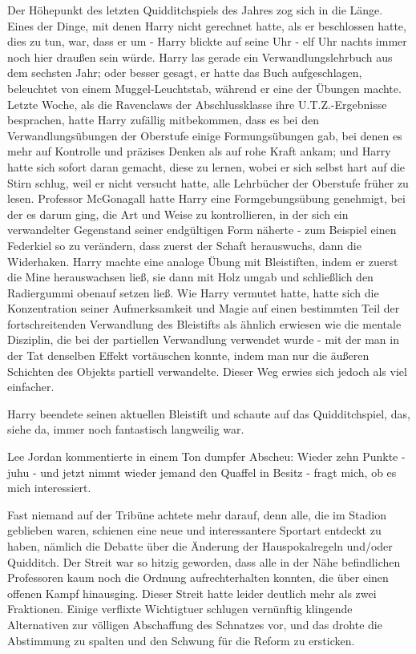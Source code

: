 Der Höhepunkt des letzten Quidditchspiels des Jahres zog sich in die Länge.
Eines der Dinge, mit denen Harry nicht gerechnet hatte, als er beschlossen
hatte, dies zu tun, war, dass er um - Harry blickte auf seine Uhr - elf Uhr
nachts immer noch hier draußen sein würde. Harry las gerade ein
Verwandlungslehrbuch aus dem sechsten Jahr; oder besser gesagt, er hatte das
Buch aufgeschlagen, beleuchtet von einem Muggel-Leuchtstab, während er eine der
Übungen machte. Letzte Woche, als die Ravenclaws der Abschlussklasse ihre
U.T.Z.-Ergebnisse besprachen, hatte Harry zufällig mitbekommen, dass es bei den
Verwandlungsübungen der Oberstufe einige \glqq{}Formungsübungen\grqq{} gab, bei
denen es mehr auf Kontrolle und präzises Denken als auf rohe Kraft ankam; und
Harry hatte sich sofort daran gemacht, diese zu lernen, wobei er sich selbst
hart auf die Stirn schlug, weil er nicht versucht hatte, alle Lehrbücher der
Oberstufe früher zu lesen. Professor McGonagall hatte Harry eine
Formgebungsübung genehmigt, bei der es darum ging, die Art und Weise zu
kontrollieren, in der sich ein verwandelter Gegenstand seiner endgültigen Form
näherte - zum Beispiel einen Federkiel so zu verändern, dass zuerst der Schaft
herauswuchs, dann die Widerhaken. Harry machte eine analoge Übung mit
Bleistiften, indem er zuerst die Mine herauswachsen ließ, sie dann mit Holz
umgab und schließlich den Radiergummi obenauf setzen ließ. Wie Harry vermutet
hatte, hatte sich die Konzentration seiner Aufmerksamkeit und Magie auf einen
bestimmten Teil der fortschreitenden Verwandlung des Bleistifts als ähnlich
erwiesen wie die mentale Disziplin, die bei der partiellen Verwandlung verwendet
wurde - mit der man in der Tat denselben Effekt vortäuschen konnte, indem man
nur die äußeren Schichten des Objekts partiell verwandelte. Dieser Weg erwies
sich jedoch als viel einfacher.

Harry beendete seinen aktuellen Bleistift und schaute auf das Quidditchspiel,
das, siehe da, immer noch fantastisch langweilig war.

Lee Jordan kommentierte in einem Ton dumpfer Abscheu: \glqq{}Wieder zehn Punkte -
juhu - und jetzt nimmt wieder jemand den Quaffel in Besitz - fragt mich, ob es
mich interessiert.\grqq{}

Fast niemand auf der Tribüne achtete mehr darauf, denn alle, die im Stadion
geblieben waren, schienen eine neue und interessantere Sportart entdeckt zu
haben, nämlich die Debatte über die Änderung der Hauspokalregeln und/oder
Quidditch. Der Streit war so hitzig geworden, dass alle in der Nähe befindlichen
Professoren kaum noch die Ordnung aufrechterhalten konnten, die über einen
offenen Kampf hinausging. Dieser Streit hatte leider deutlich mehr als zwei
Fraktionen. Einige verflixte Wichtigtuer schlugen vernünftig klingende
Alternativen zur völligen Abschaffung des Schnatzes vor, und das drohte die
Abstimmung zu spalten und den Schwung für die Reform zu ersticken.


